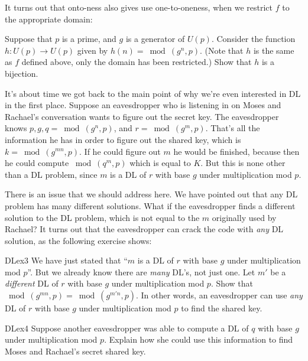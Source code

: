 It turns out that onto-ness also gives use one-to-oneness, when we restrict $f$ to the appropriate domain:

\begin{exercise}{} 
Suppose that $p$ is a prime, and $g$ is a generator of $U(p)$.  Consider the function $h: U(p) \rightarrow U(p)$ given by $h(n) = \bmod(g^n,p)$.  (Note that $h$ is the same as $f$ defined above, only the domain has been restricted.)  Show that $h$ is a bijection.
\end{exercise}

It's about time we got back to the main point of why we're even interested in  DL in the first place.  Suppose an eavesdropper who is listening in on Moses and Rachael's conversation wants to figure out the secret key. 
The eavesdropper knows $p, g, q=\bmod(g^n,p)$, and $r=\bmod(g^m,p)$.  That's all the information he has in order to figure out the shared key, which is  $k=\bmod(g^{mn},p)$. If he could figure out $m$ he would be finished, because then he could compute $\bmod(q^m,p)$ which is equal to $K$. But this is none other than a DL problem, since $m$ is a DL of $r$ with base $g$ under multiplication mod $p$.  

There is an issue that we should address here. We have pointed out that any DL problem has many different solutions. What if the eavesdropper finds a different solution to the DL problem, which is not equal to the $m$ originally used by Rachael? It turns out that the eavesdropper can crack the code with \emph{any} DL solution, as the following exercise shows:

\begin{exercise}{DLex3}
We have just stated that ``$m$ is a DL of $r$ with base $g$ under multiplication mod $p$''.  But we already know there are \emph{many} DL's, not just one. Let $m'$ be a \emph{different} DL of $r$ with base $g$ under multiplication mod $p$. Show that $\bmod(g^{mn},p)=\bmod(g^{m'n},p)$. In other words, an eavesdropper can use \emph{any} DL of $r$ with base $g$ under multiplication mod $p$ to find the shared key.
\end{exercise}

\begin{exercise}{DLex4}
Suppose another eavesdropper was able to compute a DL of $q$ with base $g$ under multiplication mod $p$.  Explain how she could use this information to find Moses and Rachael's secret shared key.
\end{exercise}

